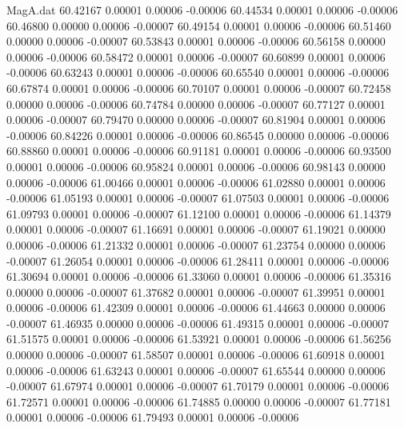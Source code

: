 \begin{filecontents}{MagA.dat}
  60.42167    0.00001    0.00006   -0.00006
  60.44534    0.00001    0.00006   -0.00006
  60.46800    0.00000    0.00006   -0.00007
  60.49154    0.00001    0.00006   -0.00006
  60.51460    0.00000    0.00006   -0.00007
  60.53843    0.00001    0.00006   -0.00006
  60.56158    0.00000    0.00006   -0.00006
  60.58472    0.00001    0.00006   -0.00007
  60.60899    0.00001    0.00006   -0.00006
  60.63243    0.00001    0.00006   -0.00006
  60.65540    0.00001    0.00006   -0.00006
  60.67874    0.00001    0.00006   -0.00006
  60.70107    0.00001    0.00006   -0.00007
  60.72458    0.00000    0.00006   -0.00006
  60.74784    0.00000    0.00006   -0.00007
  60.77127    0.00001    0.00006   -0.00007
  60.79470    0.00000    0.00006   -0.00007
  60.81904    0.00001    0.00006   -0.00006
  60.84226    0.00001    0.00006   -0.00006
  60.86545    0.00000    0.00006   -0.00006
  60.88860    0.00001    0.00006   -0.00006
  60.91181    0.00001    0.00006   -0.00006
  60.93500    0.00001    0.00006   -0.00006
  60.95824    0.00001    0.00006   -0.00006
  60.98143    0.00000    0.00006   -0.00006
  61.00466    0.00001    0.00006   -0.00006
  61.02880    0.00001    0.00006   -0.00006
  61.05193    0.00001    0.00006   -0.00007
  61.07503    0.00001    0.00006   -0.00006
  61.09793    0.00001    0.00006   -0.00007
  61.12100    0.00001    0.00006   -0.00006
  61.14379    0.00001    0.00006   -0.00007
  61.16691    0.00001    0.00006   -0.00007
  61.19021    0.00000    0.00006   -0.00006
  61.21332    0.00001    0.00006   -0.00007
  61.23754    0.00000    0.00006   -0.00007
  61.26054    0.00001    0.00006   -0.00006
  61.28411    0.00001    0.00006   -0.00006
  61.30694    0.00001    0.00006   -0.00006
  61.33060    0.00001    0.00006   -0.00006
  61.35316    0.00000    0.00006   -0.00007
  61.37682    0.00001    0.00006   -0.00007
  61.39951    0.00001    0.00006   -0.00006
  61.42309    0.00001    0.00006   -0.00006
  61.44663    0.00000    0.00006   -0.00007
  61.46935    0.00000    0.00006   -0.00006
  61.49315    0.00001    0.00006   -0.00007
  61.51575    0.00001    0.00006   -0.00006
  61.53921    0.00001    0.00006   -0.00006
  61.56256    0.00000    0.00006   -0.00007
  61.58507    0.00001    0.00006   -0.00006
  61.60918    0.00001    0.00006   -0.00006
  61.63243    0.00001    0.00006   -0.00007
  61.65544    0.00000    0.00006   -0.00007
  61.67974    0.00001    0.00006   -0.00007
  61.70179    0.00001    0.00006   -0.00006
  61.72571    0.00001    0.00006   -0.00006
  61.74885    0.00000    0.00006   -0.00007
  61.77181    0.00001    0.00006   -0.00006
  61.79493    0.00001    0.00006   -0.00006

\end{filecontents}

